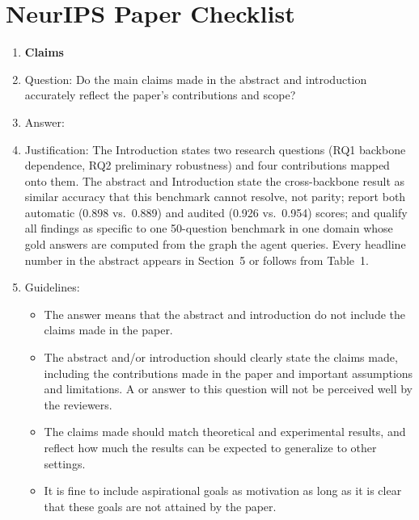 \section*{NeurIPS Paper Checklist}

\begin{enumerate}

\item {\bf Claims}
    \item[] Question: Do the main claims made in the abstract and introduction accurately reflect the paper's contributions and scope?
    \item[] Answer: \answerYes{}
    \item[] Justification: The Introduction states two research questions (RQ1 backbone dependence, RQ2 preliminary robustness) and four contributions mapped onto them. The abstract and Introduction state the cross-backbone result as similar accuracy that this benchmark cannot resolve, not parity; report both automatic (0.898 vs.\ 0.889) and audited (0.926 vs.\ 0.954) scores; and qualify all findings as specific to one 50-question benchmark in one domain whose gold answers are computed from the graph the agent queries. Every headline number in the abstract appears in Section~5 or follows from Table~1.
    \item[] Guidelines:
    \begin{itemize}
        \item The answer \answerNA{} means that the abstract and introduction do not include the claims made in the paper.
        \item The abstract and/or introduction should clearly state the claims made, including the contributions made in the paper and important assumptions and limitations. A \answerNo{} or \answerNA{} answer to this question will not be perceived well by the reviewers. 
        \item The claims made should match theoretical and experimental results, and reflect how much the results can be expected to generalize to other settings. 
        \item It is fine to include aspirational goals as motivation as long as it is clear that these goals are not attained by the paper. 
    \end{itemize}


\end{enumerate}
